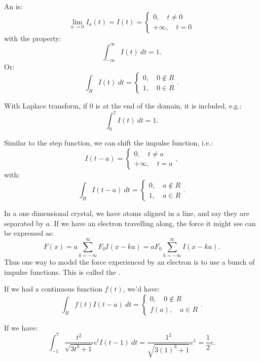 \documentclass[../main/main.tex]{subfiles}
\begin{document}
\begin{definition}
	An   is: \[
		\lim\limits_{a \to 0} I_a(t) = I(t) = \begin{cases}
			0,\quad t\neq 0\\
			+\infty,\quad t=0
		\end{cases}
	\] with the property: \[
	\int^\infty_{-\infty}I(t) ~dt = 1
	.\] Or: \[
	\int_R I(t)~dt = \begin{cases}
		0,\quad 0\not\in R\\
		1,\quad 0 \in R
	\end{cases}
	.\] 

\end{definition}
\begin{remark}
	With Laplace transform, if $0$ is at the end of the domain, it is included, e.g.: \[
		\int^7_0 I(t)~dt = 1
	.\] 
\end{remark}
\begin{remark}
	Similar to the step function, we can shift the impulse function, i.e.: \[
		I(t-a) = \begin{cases}
			0,\quad t\neq a\\
			+\infty,\quad t=a
		\end{cases}
	,\] with: \[
	\int_R I(t-a)~dt = \begin{cases}
		0,\quad a\not\in R\\ 1,\quad a \in R
	\end{cases}
	.\]  
\end{remark}
\begin{example}
	In a one dimensional crystal, we have atoms aligned in a line, and say they are separated by $a$. If we have an electron travelling along, the force it might see can be expressed as: \[
		F(x) = a\sum_{k=-\infty}^{\infty} F_0 I(x-ka) = aF_0 \sum_{k=-\infty}^{\infty} I(x-ka) 
	.\] Thus one way to model the force experienced by an electron is to use a bunch of impulse functions. This is called the .
\end{example}
\begin{remark}
	If we had a continuous function $f(t)$, we'd have: \[
		\int_R f(t) I(t-a)~dt = \begin{cases}
			0,\quad 0\not\in R \\ f(a),\quad a\in  R
		\end{cases}
	.\] 
\end{remark}
\begin{example}
	If we have: \[
		\int^7_{-1}\frac{t^2}{\sqrt{3t ^{3}+1} }e^{t}I(t-1)~dt = \frac{1^2}{\sqrt{3(1)^3+1} }e^{1} = \frac{1}{2}e
	.\] 
\end{example}
\end{document}
